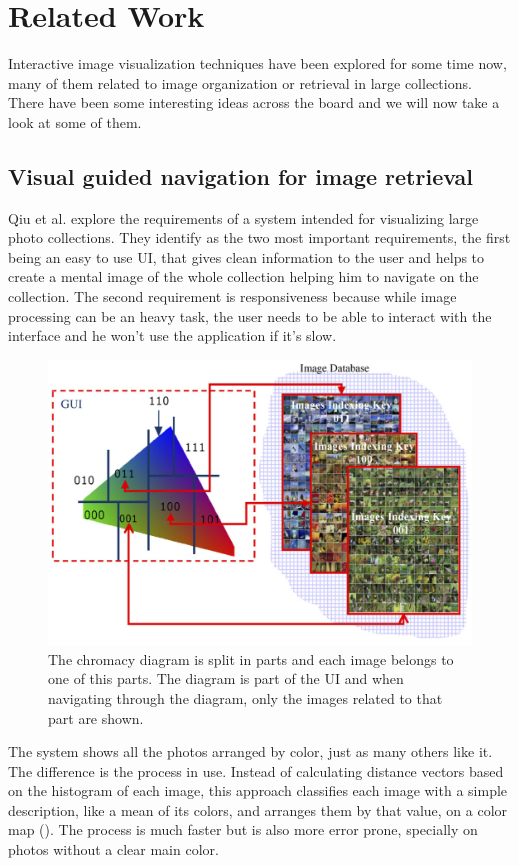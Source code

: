 \chapter{Related Work}
\label{chapter:related-work}


Interactive image visualization techniques have been explored for some time now, many of them related to image organization or retrieval in large collections. There have been some interesting ideas across the board and we will now take a look at some of them.



\section{Visual guided navigation for image retrieval} %
\label{sub:Qiu}

Qiu et al. \cite{Qiu:2007p1207} explore the requirements of a system intended for visualizing large photo collections. They identify as the two most important requirements, the first being an easy to use \ac{UI}, that gives clean information to the user and helps to create a mental image of the whole collection helping him to navigate on the collection. The second requirement is responsiveness because while image processing can be an heavy task, the user needs to be able to interact with the interface and he won't use the application if it's slow. 

\begin{figure}[ht]
	\centering
		\includegraphics[width=0.6\columnwidth]{imgs-RelatedWork/Qiu-2007p1207.png}
	\caption{The chromacy diagram is split in parts and each image belongs to one of this parts. The diagram is part of the \ac{UI} and  when navigating through the diagram, only the images related to that part are shown.}
	\label{fig:qiu1}
\end{figure}

The system shows all the photos arranged by color, just as many others like it. The difference is the process in use. Instead of calculating distance vectors based on the histogram of each image, this approach classifies each image with a simple description, like a mean of its colors, and arranges them by that value, on a color map (). The process is much faster but is also more error prone, specially on photos without a clear main color.

